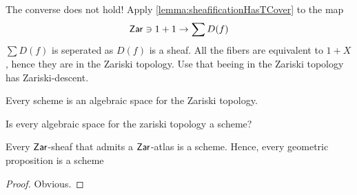 \begin{warning}
	The converse does not hold! Apply \ref{lemma:sheafificationHasTCover} to the map
	\[\mathsf{Zar} \ni 1 + 1 \to \sum D(f) \]
	$\sum D(f)$ is seperated as $D(f)$ is a sheaf.
	All the fibers are equivalent to $1 + X$, hence they are in the Zariski topology.
	Use that beeing in the Zariski topology has Zariski-descent.	
\end{warning}
\begin{corollary}
		Every scheme is an algebraic space for the Zariski topology.
\end{corollary}
\begin{question}
	Is every algebraic space for the zariski topology a scheme?
\end{question}
\begin{lemma}
	Every $\mathsf{Zar}$-sheaf that admits a $\mathsf{Zar}$-atlas is a scheme. Hence, every geometric proposition is a scheme
\end{lemma}
\begin{proof}
	Obvious.
\end{proof}
%
%
